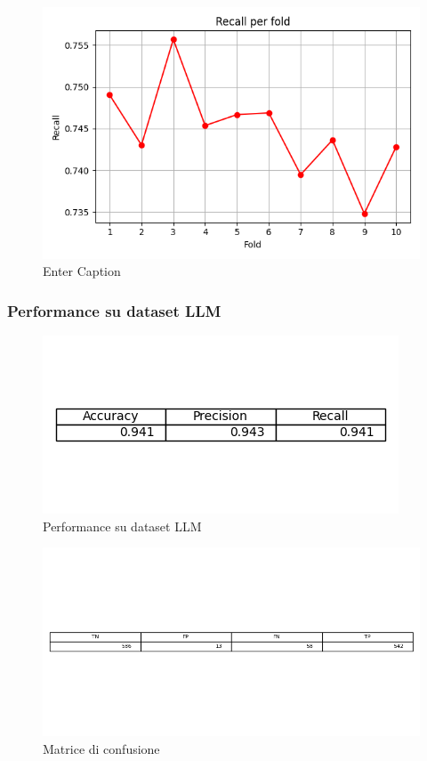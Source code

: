 \documentclass[12pt,a4paper]{report} %
\begin{document}
\begin{figure}[H]
    \centering
    \includegraphics[width=0.75\linewidth]{immagini_modeling/recall_nb_tfidf.png}
    \caption{Enter Caption}
    \label{fig:enter-label}
\end{figure}
\subsubsection{Performance su dataset LLM}
\begin{figure}[H]
    \centering
    \includegraphics[width=0.75\linewidth]{immagini_modeling/nb_tfidf_llm.png}
    \caption{Performance su dataset LLM}
    \label{fig:enter-label}
\end{figure}
\begin{figure}[H]
    \centering
    \includegraphics[width=1\linewidth]{immagini_modeling/matrice_nb_tfidf.png}
    \caption{Matrice di confusione}
  
    \label{fig:enter-label}
\end{figure}
\end{document}
